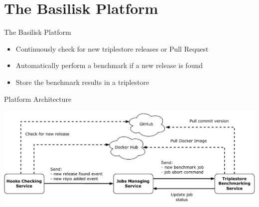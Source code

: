 \section{The Basilisk Platform}
\begin{frame}{The Basilisk Platform}
	\begin{itemize}
		\item Continuously check for new triplestore releases or Pull Request
		\item Automatically perform a benchmark if a new release is found
		\item Store the benchmark results in a triplestore
	\end{itemize}
	
	
\end{frame}


\begin{frame}{Platform Architecture}
	\centering
	
	\includegraphics[width=1\textwidth]{images/basilisk/high-level-design-approach.pdf}
	
\end{frame}